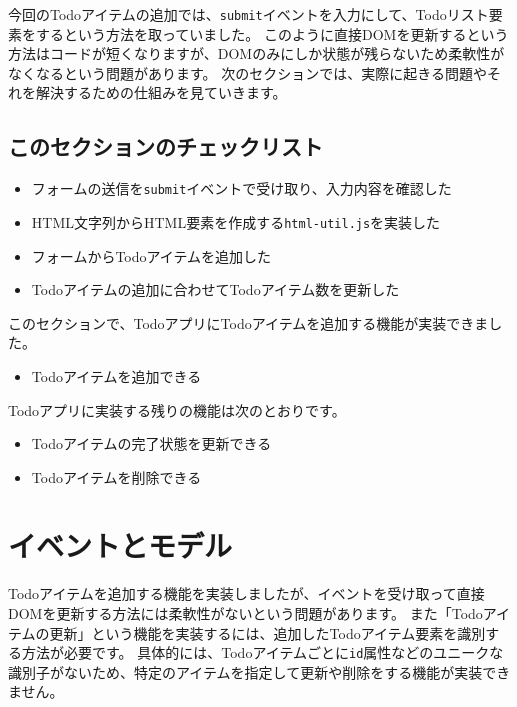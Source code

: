 今回のTodoアイテムの追加では、\texttt{submit}イベントを入力にして、Todoリスト要素を\textbf{}するという方法を取っていました。
このように直接DOMを更新するという方法はコードが短くなりますが、DOMのみにしか状態が残らないため柔軟性がなくなるという問題があります。
次のセクションでは、実際に起きる問題やそれを解決するための仕組みを見ていきます。

\hypertarget{section-checklist}{%
\subsection{このセクションのチェックリスト}\label{section-checklist}}

\begin{itemize}
\item
  フォームの送信を\texttt{submit}イベントで受け取り、入力内容を確認した
\item
  HTML文字列からHTML要素を作成する\texttt{html-util.js}を実装した
\item
  フォームからTodoアイテムを追加した
\item
  Todoアイテムの追加に合わせてTodoアイテム数を更新した
\end{itemize}

このセクションで、TodoアプリにTodoアイテムを追加する機能が実装できました。

\begin{itemize}
\item
  Todoアイテムを追加できる
\end{itemize}

Todoアプリに実装する残りの機能は次のとおりです。

\begin{itemize}
\item
  Todoアイテムの完了状態を更新できる
\item
  Todoアイテムを削除できる
\end{itemize}

\hypertarget{event-model}{%
\section{イベントとモデル}\label{event-model}}

Todoアイテムを追加する機能を実装しましたが、イベントを受け取って直接DOMを更新する方法には柔軟性がないという問題があります。
また「Todoアイテムの更新」という機能を実装するには、追加したTodoアイテム要素を識別する方法が必要です。
具体的には、Todoアイテムごとに\texttt{id}属性などのユニークな識別子がないため、特定のアイテムを指定して更新や削除をする機能が実装できません。

